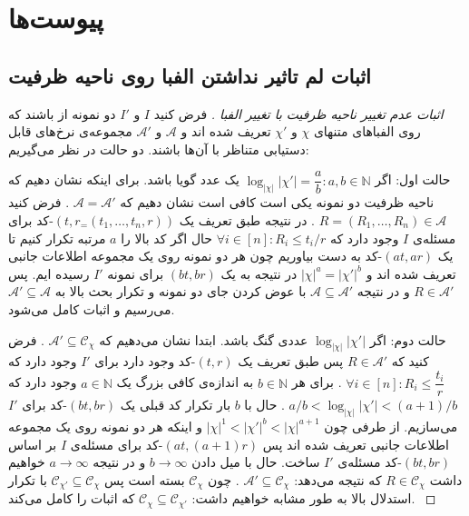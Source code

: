 \section{پیوست‌ها}
\subsection{اثبات لم تاثیر نداشتن الفبا روی ناحیه ظرفیت}
\label{appendix:l1}

\begin{proof}[
	اثبات عدم تغییر ناحیه ظرفیت با تغییر الفبا
	]
	فرض کنید
	$I$
	و
	$I'$
	دو نمونه از 
	\icod
	باشند که روی الفباهای متنهای
	$\chi$
	و
	$\chi'$
	تعریف شده اند و
	$\mathscr{A}$
	و
	$ \mathscr{A}'$
	مجموعه‌ی نرخ‌های قابل دستیابی متناظر با آن‌ها باشند.
	دو حالت در نظر می‌گیریم:
	
	حالت اول: اگر
	$\log_{|\chi|} |\chi'| = \dfrac{a}{b}: a, b \in \mathbb{N}$
	یک عدد گویا باشد. برای اینکه نشان دهیم که ناحیه ظرفیت دو نمونه یکی است کافی است نشان دهیم که
	$\mathscr{A} = \mathscr{A}'$
	. فرض کنید
	$R = (R_1, \ldots, R_n) \in \mathscr{A}$
	. در نتیجه طبق تعریف یک 
	$(t, r_ = (t_1, \ldots, t_n, r))$-کد
	برای مسئله‌ی
	$I$
	وجود دارد که
	$\forall i \in [n]: R_i \leq t_i / r$
	حال اگر کد بالا را
	$a$
	مرتبه تکرار کنیم تا یک
	$(at, ar)$-کد
	به دست بیاوریم چون هر دو نمونه روی یک مجموعه اطلاعات جانبی تعریف شده اند و 
	$|\chi|^a = |\chi'|^b$
	در نتیجه به یک
	$(bt, br)$
	برای نمونه
	$I'$
	رسیده ایم. پس
	$R \in \mathscr{A}'$
	و در نتیجه
	$\mathscr{A} \subseteq \mathscr{A}'$
	با عوض کردن جای دو نمونه و تکرار بحث بالا به
		$\mathscr{A}' \subseteq \mathscr{A}$
		می‌رسیم و اثبات کامل می‌شود.
		
		حالت دوم: اگر
		$\log_{|\chi|} |\chi'| $
		عددی گنگ باشد. ابتدا نشان می‌دهیم که
		$\mathscr{A}' \subseteq \mathscr{C}_{\chi}$
		. فرض کنید که
		$R \in \mathscr{A}'$
		پس طبق تعریف یک
		$(t, r)$-کد
		وجود دارد برای
		$I'$
		وجود دارد که
		$\forall i \in [n]: R_i \leq \dfrac{t_i}{r}$
		. برای هر
		$b \in \mathbb{N}$
		به اندازه‌ی کافی بزرگ یک
		$a \in \mathbb{N}$
		وجود دارد که
		$a/b < \log_{|\chi|} |\chi'| < (a+1)/b$
		. حال با
		$b$
		بار تکرار کد قبلی یک 
		$(bt, br)$-کد
		برای
		$I'$
		می‌سازیم. از طرفی چون
		$|\chi|^1 < |\chi'|^b < |\chi|^{a + 1}$
		و اینکه هر دو نمونه روی یک مجموعه اطلاعات جانبی تعریف شده اند پس
		$(at, (a+1)r)$-کد
		برای مسئله‌ی
		$I$
		بر اساس
		$(bt, br)$-کد
		 مسئله‌ی
		 $I'$
		 ساخت. حال با میل دادن
		 $b \rightarrow \infty$
		 و در نتیجه
		 $a \rightarrow \infty$
		 خواهیم داشت
		 $R \in \mathscr{C}_{\chi}$
		  که نتیجه می‌دهد:
		  $\mathscr{A}' \subseteq \mathscr{C}_{\chi}$
		  . چون
		  $\mathscr{C}_{\chi}$
		  بسته است پس
		  $\mathscr{C}_{\chi'} \subseteq \mathscr{C}_{\chi}$
		  با تکرار استدلال بالا به طور مشابه خواهیم داشت:
		  $\mathscr{C}_{\chi} \subseteq \mathscr{C}_{\chi'}$
		  که اثبات را کامل می‌کند.
		  \cite{fatemehbook}
\end{proof}


